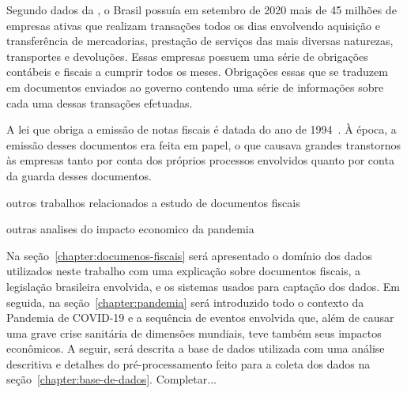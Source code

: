 \newcommand{\comando}[1]{\textbf{$\backslash$#1}}

Segundo dados da , o Brasil possuía em setembro de 2020 mais de 45 milhões de empresas ativas que realizam transações todos os dias envolvendo aquisição e transferência de mercadorias, prestação de serviços das mais diversas naturezas, transportes e devoluções. Essas empresas possuem uma série de obrigações contábeis e fiscais a cumprir todos os meses. Obrigações essas que se traduzem em documentos enviados ao governo contendo uma série de informações sobre cada uma dessas transações efetuadas.

A lei que obriga a emissão de notas fiscais é datada do ano de 1994~\cite{lei:1994:documentos-fiscais}. À época, a emissão desses documentos era feita em papel, o que causava grandes transtornos às empresas tanto por conta dos próprios processos envolvidos quanto por conta da guarda desses documentos.

outros trabalhos relacionados a estudo de documentos fiscais

outras analises do impacto economico da pandemia

Na seção~\ref{chapter:documenos-fiscais} será apresentado o domínio dos dados utilizados neste trabalho com uma explicação sobre documentos fiscais, a legislação brasileira envolvida, e os sistemas usados para captação dos dados. Em seguida, na seção~\ref{chapter:pandemia} será introduzido todo o contexto da Pandemia de COVID-19 e a sequência de eventos envolvida que, além de causar uma grave crise sanitária de dimensões mundiais, teve também seus impactos econômicos. A seguir, será descrita a base de dados utilizada com uma análise descritiva e detalhes do pré-processamento feito para a coleta dos dados na seção~\ref{chapter:base-de-dados}. Completar...
